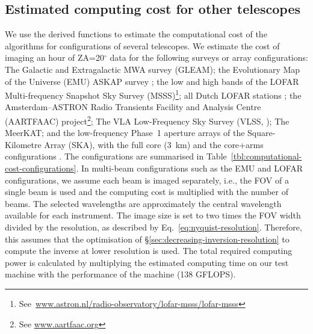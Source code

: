 \documentclass[useAMS,usenatbib]{mn2e}
\newcommand{\editmark}[1]{#1}
\newcommand{\degree}{\ensuremath{^{\circ}}\xspace}
\begin{document}
\subsection{Estimated computing cost for other telescopes} \label{sec:application-to-nonmwa}
We use the derived functions to estimate the computational cost of the algorithms for configurations of several telescopes. We estimate the cost of imaging an hour of ZA=20\degree data for the following surveys or array configurations: The Galactic and Extragalactic MWA survey (GLEAM); the Evolutionary Map of the Universe (EMU) ASKAP survey \citep{emu-norris-2011}; the low and high bands of the LOFAR Multi-frequency Snapshot Sky Survey (MSSS)\footnote{See~\href{https://www.astron.nl/radio-observatory/lofar-msss/lofar-msss}{www.astron.nl/radio-observatory/lofar-msss/lofar-msss}}; all Dutch LOFAR stations \citep{lofar-2013}; the Amsterdam--ASTRON Radio Transients Facility and Analysis Centre (AARTFAAC) project\footnote{See \href{http://www.aartfaac.org}{www.aartfaac.org}}; The VLA Low-Frequency Sky Survey (VLSS, \citealt{vlss-2007}); The \editmark{MeerKAT}; and the low-frequency Phase~1 aperture arrays of the Square-Kilometre Array (SKA), with the full core (3~km) and the core+arms configurations \citep{ska-phase1-2013}. The configurations are summarised in Table~\ref{tbl:computational-cost-configurations}. In multi-beam configurations such as the EMU and LOFAR configurations, we assume each beam is imaged separately, i.e., the FOV of a single beam is used and the computing cost is multiplied with the number of beams. The selected wavelengths 
are approximately the central wavelength available for each instrument. The image size is set to two times the FOV width divided by the resolution, as described by Eq.~\ref{eq:nyquist-resolution}. Therefore, this assumes that the optimisation of \S\ref{sec:decreasing-inversion-resolution} to \editmark{compute the} inverse at lower resolution is used. The total required computing power is calculated by multiplying the estimated computing time on our test machine with the performance of the machine (138 GFLOPS).
\end{document}
